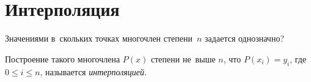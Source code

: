 
\section*{Интерполяция}


\begin{problems}

\item
Значениями в~скольких точках многочлен степени~$n$ задается однозначно?

\end{problems}

Построение такого многочлена $P(x)$ степени не~выше $n$, что
$P(x_{i}) = y_{i}$, где $0\leq i \leq n$, называется \emph{интерполяцией.}

